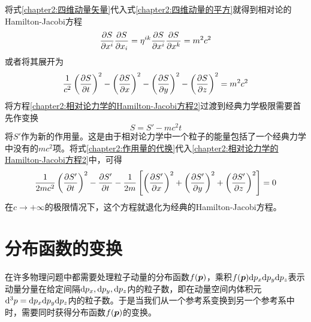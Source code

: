 将式\eqref{chapter2:四维动量矢量}代入式\eqref{chapter2:四维动量的平方}就得到相对论的Hamilton-Jacobi方程
\begin{equation}
	\frac{\partial S}{\partial x^i} \frac{\partial S}{\partial x_i} = \eta^{ik} \frac{\partial S}{\partial x^i}\frac{\partial S}{\partial x^k} = m^2c^2
	\label{chapter2:相对论力学的Hamilton-Jacobi方程}
\end{equation}
或者将其展开为
\begin{equation}
	\frac{1}{c^2}\left(\frac{\partial S}{\partial t}\right)^2 - \left(\frac{\partial S}{\partial x}\right)^2 - \left(\frac{\partial S}{\partial y}\right)^2 - \left(\frac{\partial S}{\partial z}\right)^2 = m^2c^2
	\label{chapter2:相对论力学的Hamilton-Jacobi方程2}
\end{equation}
将方程\eqref{chapter2:相对论力学的Hamilton-Jacobi方程2}过渡到经典力学极限需要首先作变换
\begin{equation}
	S = S'-mc^2t
	\label{chapter2:作用量的代换}
\end{equation}
将$S'$作为新的作用量。这是由于相对论力学中一个粒子的能量包括了一个经典力学中没有的$mc^2$项。将式\eqref{chapter2:作用量的代换}代入\eqref{chapter2:相对论力学的Hamilton-Jacobi方程2}中，可得
\begin{equation*}
	\frac{1}{2mc^2} \left(\frac{\partial S'}{\partial t}\right)^2 - \frac{\partial S'}{\partial t} - \frac{1}{2m}\left[\left(\frac{\partial S'}{\partial x}\right)^2 + \left(\frac{\partial S'}{\partial y}\right)^2 + \left(\frac{\partial S'}{\partial z}\right)^2\right] = 0
\end{equation*}
在$c\to +\infty$的极限情况下，这个方程就退化为经典的Hamilton-Jacobi方程。

\section{分布函数的变换}

在许多物理问题中都需要处理粒子动量的分布函数$f(\boldsymbol{p})$，乘积$f(\boldsymbol{p})\mathrm{d} p_x\mathrm{d} p_y\mathrm{d} p_z$表示动量分量在给定间隔$\mathrm{d} p_x, \mathrm{d} p_y, \mathrm{d} p_z$内的粒子数，即在动量空间内体积元$\mathrm{d}^3p = \mathrm{d} p_x\mathrm{d} p_y \mathrm{d} p_z$内的粒子数。于是当我们从一个参考系变换到另一个参考系中时，需要同时获得分布函数$f(\boldsymbol{p})$的变换。

